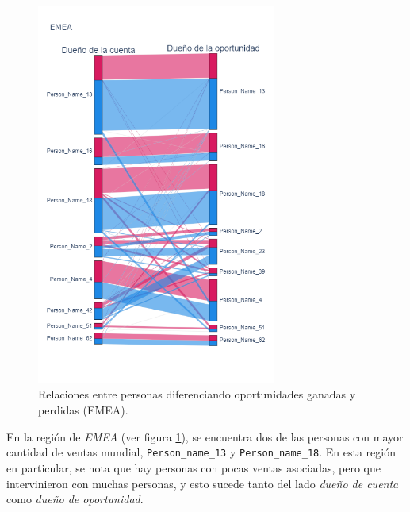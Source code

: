\documentclass[titlepage,a4paper]{article}
\begin{document}
\begin{figure}[H]
\centering
\includegraphics[width=0.7\textwidth]{images/ps_personas_EMEA.png}
\cprotect\caption{\label{fig:ps_personas_EMEA} Relaciones entre personas diferenciando oportunidades ganadas y perdidas (EMEA).}
\end{figure}

En la región de \textit{EMEA} (ver figura \ref{fig:ps_personas_EMEA}), se encuentra dos de las personas con mayor cantidad de ventas mundial, \verb|Person_name_13| y \verb|Person_name_18|. En esta región en particular, se nota que hay personas con pocas ventas asociadas, pero que intervinieron con muchas personas, y esto sucede tanto del lado \textit{dueño de cuenta} como \textit{dueño de oportunidad}.
\end{document}
